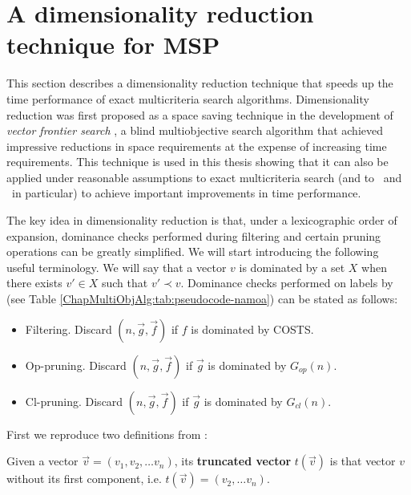 \section{A dimensionality reduction technique for MSP}
\label{chapMultiObjAlg:sec:Time-efficient-MSalg}

This section describes a dimensionality reduction technique that speeds up the time performance of exact multicriteria search algorithms. Dimensionality reduction was first proposed as a space saving technique in the development of \emph{vector frontier search} \citep{Mandow2008,Mandow2009}, a blind multiobjective search algorithm that achieved impressive reductions in space requirements at the expense of increasing time requirements. This technique is used in this thesis showing that it can also be applied under reasonable assumptions to exact multicriteria search (and to \namoa \ and \lexgo \ in particular) to achieve important improvements in time performance. 

The key idea in dimensionality reduction is that, under a lexicographic order of expansion, dominance checks performed during filtering and certain pruning operations can be greatly simplified. We will start introducing the following useful terminology. We will say that  a vector $v$ is dominated by a set $X$ when there exists $v'\in X$ such that $v'\prec v$. Dominance checks performed on labels by \namoa (see Table \ref{ChapMultiObjAlg:tab:pseudocode-namoa}) can be stated as follows:
\begin{itemize}
    \item Filtering. Discard $(n,\vec g,\vec f)$ if $f$ is dominated by COSTS.
	 \item Op-pruning. Discard $(n,\vec g,\vec f)$ if $\vec g$ is dominated by $G_{op}(n)$.
	 \item Cl-pruning. Discard $(n,\vec g,\vec f)$ if $\vec g$ is dominated by $G_{cl}(n)$.
\end{itemize}

First we reproduce two definitions from \cite{Mandow2009}:

\begin{defi} \label{chapMultiObjAlg:def:tv}
Given a vector $ \vec v = (v_1, v_2, \ldots v_n)$, its \textbf{truncated vector} $ {t(\vec v)}$ is that vector $v$ without its first component, i.e. $ {t(\vec v)} = (v_2, \ldots v_n)$.
\end{defi}

